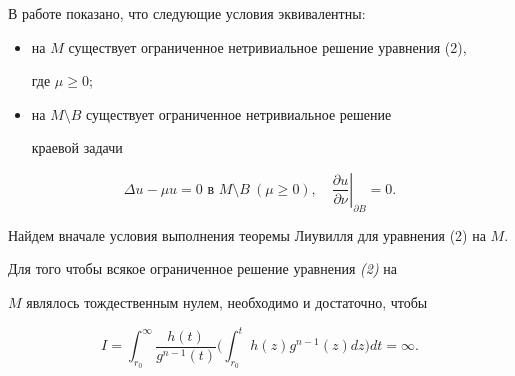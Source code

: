 \begin{note} В работе \cite{Gri} показано, что следующие условия эквивалентны:


\begin{itemize}


\item[а)] на $M$ существует ограниченное нетривиальное решение уравнения (2),


где $\mu\ge 0$;


\item[б)] на $M \setminus B$ существует ограниченное нетривиальное решение


краевой задачи


\end{itemize}


\begin{equation}


\Delta u - \mu u = 0 \text { в } M \setminus B \ (\mu\ge 0),\quad


\left. \frac{\partial u}{\partial \nu} \right |_{\partial B}=0.


\end{equation}


\end{note}





Найдем вначале условия выполнения теоремы Лиувилля для уравнения (2) на $M$.





\begin{lem} Для того чтобы всякое ограниченное решение уравнения {\em (2)} на


$M$ являлось тождественным нулем, необходимо и достаточно, чтобы


$$


I=\int_{r_0}^{\infty}\frac{h(t)}{g^{n-1}(t)}\biggl(\int_{r_0}^{t}


h(z)g^{n-1}(z)dz\biggr)dt = \infty.


$$


\end{lem}





